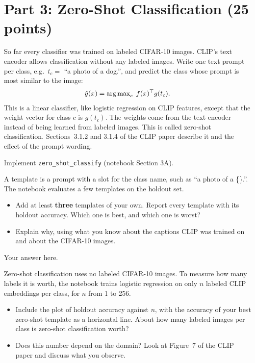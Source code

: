 \section{Part 3: Zero-Shot Classification (25 points)}

So far every classifier was trained on labeled CIFAR-10 images. CLIP's text encoder
allows classification without any labeled images. Write one text prompt per class,
e.g.\ $t_c = $ ``a photo of a dog.'', and predict the class whose prompt is most
similar to the image:
\[
  \hat y(x) = \operatorname{arg\,max}_{c} \; f(x)^\top g(t_c).
\]
This is a linear classifier, like logistic regression on CLIP features, except that the
weight vector for class $c$ is $g(t_c)$. The weights come from the text encoder instead
of being learned from labeled images. This is called zero-shot classification.
Sections~3.1.2 and 3.1.4 of the CLIP paper describe it and the effect of the prompt
wording.

\begin{question}[5]
Implement \texttt{zero\_shot\_classify} (notebook Section 3A).
\end{question}

\begin{question}[10]
A template is a prompt with a slot for the class name, such as
``a photo of a \{\}.''. The notebook evaluates a few templates on the holdout set.
\begin{itemize}
  \item Add at least \textbf{three} templates of your own. Report every template with
    its holdout accuracy. Which one is best, and which one is worst?
  \item Explain why, using what you know about the captions CLIP was trained on and
    about the CIFAR-10 images.
\end{itemize}
\end{question}

\begin{solution}
Your answer here.
\end{solution}

\begin{question}[10]
Zero-shot classification uses no labeled CIFAR-10 images. To measure how many labels it
is worth, the notebook trains logistic regression on only $n$ labeled CLIP embeddings per
class, for $n$ from 1 to 256.
\begin{itemize}
  \item Include the plot of holdout accuracy against $n$, with the accuracy of your best
    zero-shot template as a horizontal line. About how many labeled images per class is
    zero-shot classification worth?
  \item Does this number depend on the domain? Look at Figure~7 of the CLIP paper and
    discuss what you observe.
\end{itemize}
\end{question}

